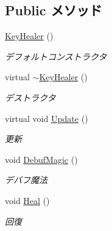 \subsection*{Public メソッド}
\begin{DoxyCompactItemize}
\item 
\hyperlink{class_key_healer_a3be7db98421440b89f945a95e4066b24}{Key\-Healer} ()
\begin{DoxyCompactList}\small\item\em デフォルトコンストラクタ \end{DoxyCompactList}\item 
virtual \hyperlink{class_key_healer_a02a89cba9b8d2bfa507b99e521a50e6a}{$\sim$\-Key\-Healer} ()
\begin{DoxyCompactList}\small\item\em デストラクタ \end{DoxyCompactList}\item 
virtual void \hyperlink{class_key_healer_a4f38c5471c7529cc666ec3c1cd73f5d4}{Update} ()
\begin{DoxyCompactList}\small\item\em 更新 \end{DoxyCompactList}\item 
void \hyperlink{class_key_healer_aa45cde4f69049b17b47098aa2de962f9}{Debuf\-Magic} ()
\begin{DoxyCompactList}\small\item\em デバフ魔法 \end{DoxyCompactList}\item 
void \hyperlink{class_key_healer_a5e4b84535a991a26196174525962e1bc}{Heal} ()
\begin{DoxyCompactList}\small\item\em 回復 \end{DoxyCompactList}\end{DoxyCompactItemize}
